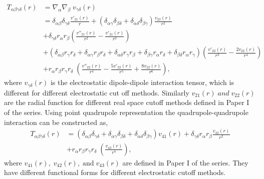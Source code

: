 \begin{equation}
\begin{split}
T_{\alpha\beta\gamma\delta}(r) &=\nabla_\alpha \nabla_\beta \;v_{\gamma\delta}(r) 
\\ &= \delta_{\alpha\beta}\delta_{\gamma\delta} \frac{v'_{21}(r)}{r} + \left(\delta_{\alpha\gamma}\delta_{\beta\delta}+ \delta_{\alpha\delta}\delta_{\beta\gamma}\right)\frac{v_{22}(r)}{r^2} 
\\ &+ \delta_{\gamma\delta} r_\alpha r_\beta \left(\frac{v''_{21}(r)}{r^2}-\frac{v'_{21}(r)}{r^3} \right)
\\ &+\left(\delta_{\alpha\beta} r_\gamma r_\delta + \delta_{\alpha\gamma} r_\beta r_\delta  +\delta_{\alpha\delta} r_\gamma r_\beta + \delta_{\beta\gamma} r_\alpha r_\delta +\delta_{\beta\delta} r_\alpha r_\gamma  \right) \left(\frac{v'_{22}(r)}{r^3}-\frac{2v_{22}(r)}{r^4}\right) 
\\ &+ r_\alpha r_\beta r_\gamma r_\delta\; \left(\frac{v''_{22}(r)}{r^4}-\frac{5v'_{22}(r)}{r^5}+\frac{8v_{22}(r)}{r^6}\right), 
\end{split}
\label{quadDip}
\end{equation}
where $v_{\gamma\delta}(r)$ is the electrostatic dipole-dipole interaction tensor, which is different for different electrostatic cut off methods. Similarly $v_{21}(r) \;and\; v_{22}(r)$ are the radial function for different real space cutoff methods defined in Paper I of the series.\cite{PaperI} Using point quadrupole representation the quadrupole-quadrupole interaction can be constructed as,  
\begin{equation}
\begin{split}
T_{\alpha\beta\gamma\delta}(r) &= \left(\delta_{\alpha\beta}\delta_{\gamma\delta} + \delta_{\alpha\gamma}\delta_{\beta\delta}+ \delta_{\alpha\delta}\delta_{\beta\gamma}\right)v_{41}(r) + \delta_{\gamma\delta} r_\alpha r_\beta \frac{v_{42}(r)}{r^2} \\ &+ r_\alpha r_\beta r_\gamma r_\delta\; \left(\frac{v_{43}(r)}{r^4}\right), 
\end{split}
\label{quadRadial}
\end{equation}
where $v_{41}(r),\; v_{42}(r), \; \text{and} \; v_{43}(r)$ are defined in Paper I  of the series. \cite{PaperI} They have  different functional forms for different electrostatic cutoff methods.
